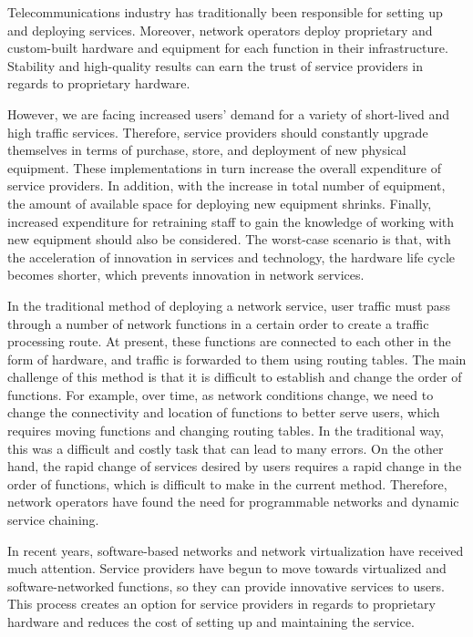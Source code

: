 Telecommunications industry has traditionally been responsible for setting up
and deploying services. Moreover, network operators deploy proprietary and
custom-built hardware and equipment for each function in their infrastructure.
Stability and high-quality results can earn the trust of service providers in
regards to proprietary hardware.

However, we are facing increased users' demand for a variety of short-lived and
high traffic services. Therefore, service providers should constantly upgrade
themselves in terms of purchase, store, and deployment of new physical
equipment. These implementations in turn increase the overall expenditure of
service providers. In addition, with the increase in total number of equipment,
the amount of available space for deploying new equipment shrinks. Finally,
increased expenditure for retraining staff to gain the knowledge of working with
new equipment should also be considered. The worst-case scenario is that, with
the acceleration of innovation in services and technology, the hardware life
cycle becomes shorter, which prevents innovation in network services.

In the traditional method of deploying a network service, user traffic must pass
through a number of network functions in a certain order to create a traffic
processing route. At present, these functions are connected to each other in the
form of hardware, and traffic is forwarded to them using routing tables. The
main challenge of this method is that it is difficult to establish and change
the order of functions. For example, over time, as network conditions change, we
need to change the connectivity and location of functions to better serve users,
which requires moving functions and changing routing tables. In the traditional
way, this was a difficult and costly task that can lead to many errors. On the
other hand, the rapid change of services desired by users requires a rapid
change in the order of functions, which is difficult to make in the current
method. Therefore, network operators have found the need for programmable
networks and dynamic service chaining.

In recent years, software-based networks and network virtualization have
received much attention. Service providers have begun to move towards
virtualized and software-networked functions, so they can provide innovative
services to users. This process creates an option for service providers in
regards to proprietary hardware and reduces the cost of setting up and
maintaining the service.


